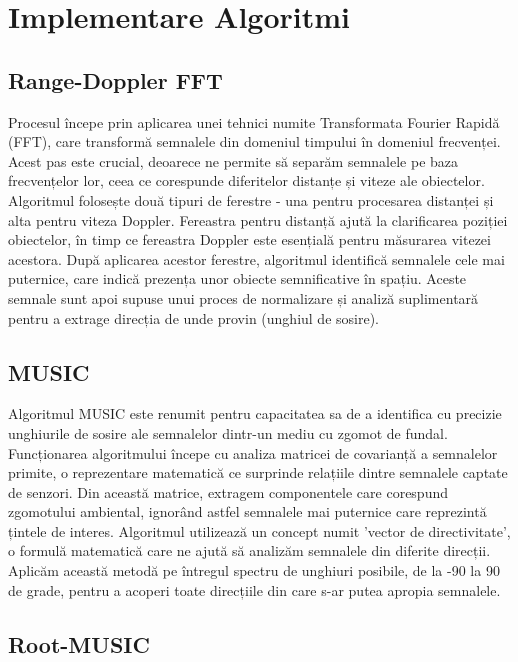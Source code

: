 \documentclass{article}
\begin{document}
\section{Implementare Algoritmi}

\subsection{Range-Doppler FFT}

Procesul începe prin aplicarea unei tehnici numite Transformata Fourier Rapidă (FFT), care transformă semnalele din domeniul timpului în domeniul frecvenței. Acest pas este crucial, deoarece ne permite să separăm semnalele pe baza frecvențelor lor, ceea ce corespunde diferitelor distanțe și viteze ale obiectelor.
Algoritmul folosește două tipuri de ferestre - una pentru procesarea distanței și alta pentru viteza Doppler. Fereastra pentru distanță ajută la clarificarea poziției obiectelor, în timp ce fereastra Doppler este esențială pentru măsurarea vitezei acestora.
După aplicarea acestor ferestre, algoritmul identifică semnalele cele mai puternice, care indică prezența unor obiecte semnificative în spațiu. Aceste semnale sunt apoi supuse unui proces de normalizare și analiză suplimentară pentru a extrage direcția de unde provin (unghiul de sosire). 

\subsection{MUSIC}

Algoritmul MUSIC este renumit pentru capacitatea sa de a identifica cu precizie unghiurile de sosire ale semnalelor dintr-un mediu cu zgomot de fundal.
Funcționarea algoritmului începe cu analiza matricei de covarianță a semnalelor primite, o reprezentare matematică ce surprinde relațiile dintre semnalele captate de senzori. Din această matrice, extragem componentele care corespund zgomotului ambiental, ignorând astfel semnalele mai puternice care reprezintă țintele de interes.
Algoritmul utilizează un concept numit 'vector de directivitate', o formulă matematică care ne ajută să analizăm semnalele din diferite direcții. Aplicăm această metodă pe întregul spectru de unghiuri posibile, de la -90 la 90 de grade, pentru a acoperi toate direcțiile din care s-ar putea apropia semnalele. \cite{music1}\cite{music2}

\subsection{Root-MUSIC}
\end{document}
